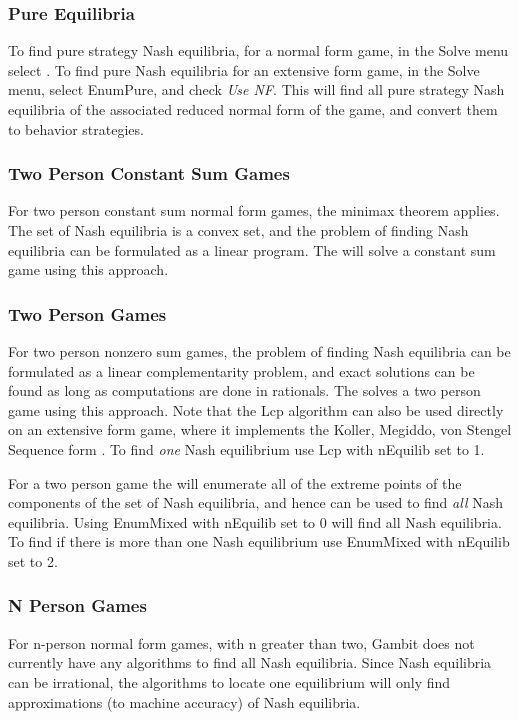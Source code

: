 \subsubsection{Pure Equilibria}\label{purenashsec}
To find pure strategy Nash equilibria, for a normal form game, in the Solve 
menu select .  
To find pure Nash equilibria for an extensive 
form game,  in the Solve menu, select EnumPure, 
and check {\em Use NF}.  This will find 
all pure strategy Nash equilibria of the associated reduced normal form of 
the game, and convert them to behavior strategies.  

\subsubsection{Two Person Constant Sum Games}\label{csumsec}
For two person constant sum normal form 
games, the minimax theorem applies.  The set of 
Nash equilibria is a convex set, and the problem of finding Nash equilibria can be 
formulated as a linear program.  The  will solve a 
constant sum game 
using this approach.  

\subsubsection{Two Person Games}\label{twopersec}
For two person nonzero sum 
games, the problem of finding Nash equilibria can be formulated as 
a linear complementarity problem, and exact solutions can be found as 
long as computations are done in rationals.  The 
 solves a two person 
game using this approach.  Note that the Lcp algorithm can also be used 
directly on an extensive form game, where it implements the Koller, Megiddo, 
von Stengel Sequence form \cite{KolMegSte:94}.  To find {\em one} Nash equilibrium 
use Lcp with nEquilib set to 1.  

For a two person game the  
will enumerate all of the extreme points of the components of the set of 
Nash equilibria, and hence can be used to find {\em all} Nash equilibria.  Using 
EnumMixed with nEquilib set to 0 will find all Nash equilibria.  To find if 
there is more than one Nash equilibrium use EnumMixed with nEquilib set to 2.  

\subsubsection{N Person Games}\label{npernashsec}
For n-person normal form games, with n greater than two, Gambit does not 
currently have any algorithms 
to find all Nash equilibria.  Since Nash equilibria can be irrational, the algorithms to 
locate one equilibrium will only find approximations (to machine accuracy) of Nash 
equilibria. 

